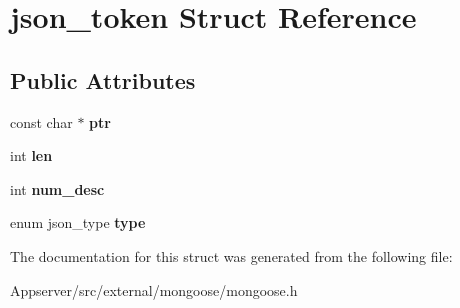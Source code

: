 \hypertarget{structjson__token}{}\section{json\+\_\+token Struct Reference}
\label{structjson__token}
\subsection*{Public Attributes}
\begin{DoxyCompactItemize}
\item 
const char $\ast$ {\bfseries ptr}\hypertarget{structjson__token_a2a93c938d0aa17cfbfa6a25f351c1004}{}\label{structjson__token_a2a93c938d0aa17cfbfa6a25f351c1004}

\item 
int {\bfseries len}\hypertarget{structjson__token_a62f334c0585bbc7b030dc0c2131dd127}{}\label{structjson__token_a62f334c0585bbc7b030dc0c2131dd127}

\item 
int {\bfseries num\+\_\+desc}\hypertarget{structjson__token_a88bdffe6c1b543a2cbfce4e6f4bf4814}{}\label{structjson__token_a88bdffe6c1b543a2cbfce4e6f4bf4814}

\item 
enum json\+\_\+type {\bfseries type}\hypertarget{structjson__token_a887277dca69b6162be38807ebfa568c9}{}\label{structjson__token_a887277dca69b6162be38807ebfa568c9}

\end{DoxyCompactItemize}


The documentation for this struct was generated from the following file\+:\begin{DoxyCompactItemize}
\item 
Appserver/src/external/mongoose/mongoose.\+h\end{DoxyCompactItemize}
